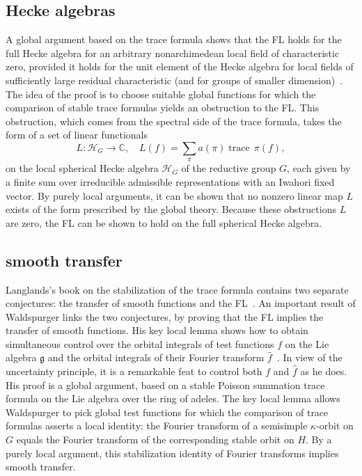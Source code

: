 \documentclass[brochure,english,12pt]{bourbaki}
\theoremstyle{plain}
\def\op#1{{\operatorname{#1}}}
\newcommand{\ring}[1]{\mathbb{#1}}
\def\g{\mathfrak{g}}
\begin{document}
\subsection{Hecke algebras}


 A global argument based on
the trace formula shows that the FL holds for the full
Hecke algebra for an arbitrary nonarchimedean local field of
characteristic zero, provided it holds for the unit element of the
Hecke algebra for local fields of sufficiently large residual
characteristic (and for groups of smaller dimension)~\cite{FLSE}.  
The idea of the proof is to choose suitable global
functions for which the comparison of stable trace formulas yields an
obstruction to the FL.  This obstruction, which comes from the
spectral side of the trace formula, takes the form
of a set of linear functionals  
\[
L:{\mathcal H}_G\to\ring{C},\quad L(f) = \sum_\pi a(\pi) \op{trace}\,\pi(f),
\]
on the local spherical Hecke
algebra ${\mathcal H}_G$ of the reductive group $G$, each given by a finite sum over
irreducible admissible representations with an Iwahori fixed vector.
By purely local arguments, it
can be shown that no nonzero linear map $L$ exists of the form
prescribed by the global theory.  
Because these obstructions $L$ are zero,
the FL can be shown to hold on the full spherical Hecke algebra.


\subsection{smooth transfer}

Langlands's book on the stabilization of the trace formula contains
two separate conjectures:  the transfer of smooth
functions  and the FL~\cite{Langlands:debuts}.  An important result
of Waldspurger links the two conjectures, by proving that the
FL implies the transfer of smooth functions.  
His key local lemma shows how to obtain simultaneous control over the
orbital integrals of test functions $f$ on the Lie algebra $\g$ and the orbital integrals of
their Fourier transform $\hat f$~\cite[Prop.~8.2]{Wald:transfert}.  
In view of the uncertainty principle, it is a remarkable feat to
control both $f$ and $\hat f$ as he does.
His proof is a global argument, based on a stable Poisson summation
trace formula on the Lie algebra over the ring of adeles.  The key local lemma allows
Waldspurger to pick global test functions for which the comparison of
trace formulas asserts a local identity: the Fourier transform of a
semisimple $\kappa$-orbit on $G$ equals the Fourier transform of the
corresponding stable orbit on $H$.  By a purely local argument, this
stabilization identity of Fourier transforms  implies smooth transfer.
\end{document}
